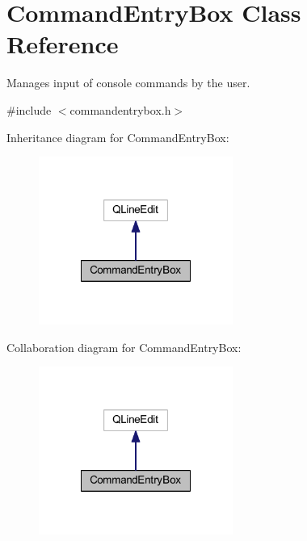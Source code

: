 \hypertarget{class_command_entry_box}{\section{Command\-Entry\-Box Class Reference}
\label{class_command_entry_box}
}


Manages input of console commands by the user.  




{\ttfamily \#include $<$commandentrybox.\-h$>$}



Inheritance diagram for Command\-Entry\-Box\-:\nopagebreak
\begin{figure}[H]
\begin{center}
\leavevmode
\includegraphics[width=180pt]{class_command_entry_box__inherit__graph}
\end{center}
\end{figure}


Collaboration diagram for Command\-Entry\-Box\-:\nopagebreak
\begin{figure}[H]
\begin{center}
\leavevmode
\includegraphics[width=180pt]{class_command_entry_box__coll__graph}
\end{center}
\end{figure}
